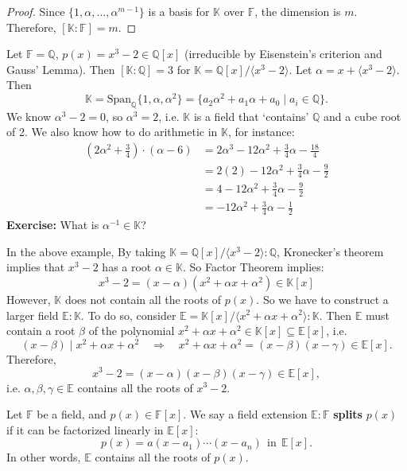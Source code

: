\begin{proof}
Since $\{1, \alpha, \dots, \alpha^{m-1}\}$ is a basis for $\mathbb{K}$ over $\mathbb{F}$, the dimension is $m$.
Therefore, $[\mathbb{K}:\mathbb{F}] = m$.
\end{proof}

\begin{example}
Let $\mathbb{F}=\mathbb{Q}$, $p(x)=x^3-2 \in \mathbb{Q}[x]$ (irreducible by Eisenstein's criterion and Gauss' Lemma).
Then $[\mathbb{K}:\mathbb{Q}]=3$ for $\mathbb{K}=\mathbb{Q}[x]/\langle x^3-2 \rangle$.
Let $\alpha = x + \langle x^3-2 \rangle$. Then $$\mathbb{K} = \text{Span}_{\mathbb{Q}}\{1, \alpha, \alpha^2\} = \{a_2\alpha^2+a_1\alpha+a_0 \mid a_i \in \mathbb{Q}\}.$$
We know $\alpha^3-2=0$, so $\alpha^3=2$, i.e.
$\mathbb{K}$ is a field that `contains' $\mathbb{Q}$ and a cube root of 2. We also know how to do arithmetic in $\mathbb{K}$, for instance:
\begin{align*}
(2\alpha^2+\tfrac{3}{4}) \cdot (\alpha-6) &= 2\alpha^3 - 12\alpha^2 + \tfrac{3}{4}\alpha - \tfrac{18}{4} \\
&= 2(2) - 12\alpha^2 + \tfrac{3}{4}\alpha - \tfrac{9}{2} \\
&= 4 - 12\alpha^2 + \tfrac{3}{4}\alpha - \tfrac{9}{2} \\
&= -12\alpha^2 + \tfrac{3}{4}\alpha - \tfrac{1}{2}
\end{align*}
\textbf{Exercise:} What is $\alpha^{-1} \in \mathbb{K}$?
\end{example}

In the above example, By taking $\mathbb{K} = \mathbb{Q}[x]/\langle x^3-2\rangle : \mathbb{Q}$, Kronecker's theorem implies that $x^3 -2$ has a root $\alpha \in \mathbb{K}$. So Factor Theorem implies:
$$x^3 -2 = (x-\alpha)(x^2 + \alpha x + \alpha^2) \in \mathbb{K}[x]$$ 
However, $\mathbb{K}$ does not contain all the roots of $p(x)$. So we have to construct a larger field $\mathbb{E} : \mathbb{K}$. To do so, consider $\mathbb{E} = \mathbb{K}[x]/\langle x^2+\alpha x+\alpha^2 \rangle : \mathbb{K}$. Then $\mathbb{E}$ must contain a root $\beta$ of the polynomial $x^2+\alpha x+\alpha^2 \in \mathbb{K}[x] \subseteq \mathbb{E}[x]$, i.e.
$$(x-\beta) \mid x^2+\alpha x+\alpha^2 \quad \Longrightarrow \quad x^2+\alpha x+\alpha^2 = (x-\beta)(x-\gamma) \in \mathbb{E}[x].$$
Therefore,
$$x^3-2 = (x-\alpha)(x-\beta)(x-\gamma) \in \mathbb{E}[x],$$
i.e. $\alpha, \beta, \gamma \in \mathbb{E}$ contains all the roots of $x^3 - 2$.

\begin{definition}
Let $\mathbb{F}$ be a field, and $p(x) \in \mathbb{F}[x]$. We say a field extension $\mathbb{E}:\mathbb{F}$ {\bf splits} $p(x)$ if it can be factorized linearly in $\mathbb{E}[x]$:
$$p(x) = a(x-a_1)\cdots(x-a_n)\ \ \mathrm{in}\ \ \mathbb{E}[x].$$
In other words, $\mathbb{E}$ contains all the roots of $p(x)$.
\end{definition}

